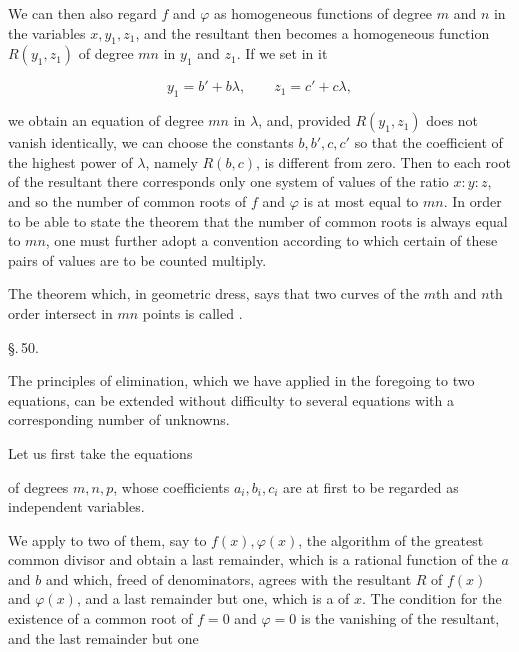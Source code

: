 We can then also regard $f$ and $\varphi$ as homogeneous functions
of degree $m$ and $n$ in the variables $x, y_1, z_1$, and
the resultant then becomes a homogeneous function $R(y_1, z_1)$
of degree $mn$ in $y_1$ and $z_1$. If we set in it

\[
y_1 = b' + b\lambda, \qquad z_1 = c' + c\lambda,
\]

we obtain an equation of degree $mn$ in $\lambda$, and,
provided $R(y_1, z_1)$ does not vanish identically, we can choose the constants
$b, b', c, c'$ so that the coefficient of the highest
power of $\lambda$, namely $R(b, c)$, is different from zero. Then
to each root of the resultant there corresponds only one system of values
of the ratio $x:y:z$, and so the number of common
roots of $f$ and $\varphi$ is at most equal to $mn$. In order to be able to
state the theorem that the number of common roots
is always equal to $mn$, one must further adopt a convention
according to which certain of these pairs of values are to be counted multiply.

The theorem which, in geometric dress, says that
two curves of the $m$th and $n$th order intersect in $mn$ points
is called .

\begin{center}
§.\,50.

\end{center}

The principles of elimination, which we have applied in the
foregoing to two equations, can be extended without
difficulty to several equations with a corresponding
number of unknowns.

Let us first take the equations


of degrees $m, n, p$, whose coefficients $a_i, b_i, c_i$ are at first to be
regarded as independent variables.

We apply to two of them, say to $f(x), \varphi(x)$, the
algorithm of the greatest common divisor and
obtain a last remainder, which is a rational function of the $a$
and $b$ and which, freed of denominators, agrees with the resultant $R$
of $f(x)$ and $\varphi(x)$, and a last remainder but one, which is a
 of $x$. The condition for the existence
of a common root of $f = 0$ and $\varphi = 0$
is the vanishing of the resultant, and the last remainder but one
